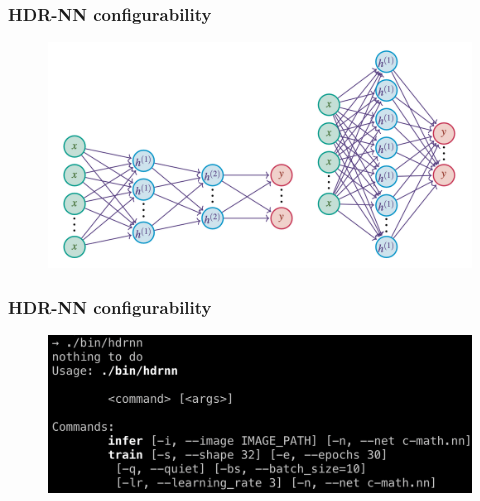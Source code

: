 \documentclass{beamer}
\begin{document}
\begin{frame}
  \frametitle{HDR-NN configurability}

  \begin{figure}
    \centering
    \includegraphics[scale=0.37]{images/networks.png}
  \end{figure}

\end{frame}

\begin{frame}
  \frametitle{HDR-NN configurability}

  \begin{figure}
    \centering
    \includegraphics[scale=0.37]{images/usage.png}
  \end{figure}

\end{frame}
\end{document}
